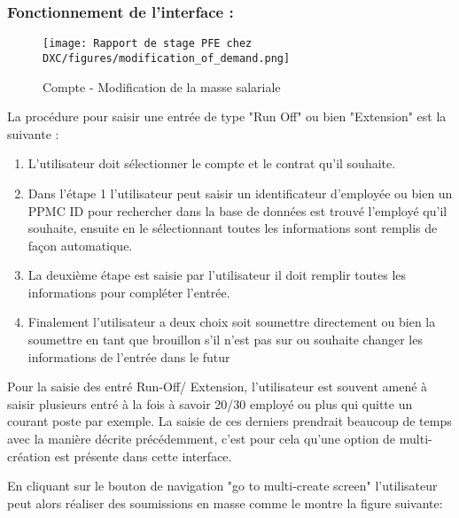 \subsubsection{Fonctionnement de l'interface :}

\begin{figure}[H]
    \centering
    \texttt{[image: Rapport de stage PFE chez DXC/figures/modification\_of\_demand.png]}
    \caption{Compte - Modification de la masse salariale}
\end{figure}

La procédure pour saisir une entrée de type "Run Off" ou bien "Extension" est la suivante :

\begin{enumerate}
    
    \item L'utilisateur doit sélectionner le compte et le contrat qu'il souhaite.
    \vspace{0.1cm}
    \item Dans l'étape 1 l'utilisateur peut saisir un identificateur d’employée ou bien un PPMC ID pour rechercher dans la base de données est trouvé l'employé qu'il souhaite, ensuite en le sélectionnant toutes les informations sont remplis de façon automatique.
    \vspace{0.1cm}
    \item La deuxième étape est saisie par l'utilisateur il doit remplir toutes les informations pour compléter l'entrée.
    \vspace{0.1cm}
    \item Finalement l'utilisateur a deux choix soit soumettre directement ou bien la soumettre en tant que brouillon s'il n'est pas sur ou souhaite changer les informations de l'entrée dans le futur

\end{enumerate}

\newpage
Pour la saisie des entré Run-Off/ Extension, l'utilisateur est souvent amené à saisir plusieurs entré à la fois à savoir 20/30 employé ou plus qui quitte un courant poste par exemple. La saisie de ces derniers prendrait beaucoup de temps avec la manière décrite précédemment, c'est pour cela qu'une option de multi-création est présente dans cette interface. 

\vspace{0.3cm}

En cliquant sur le bouton de navigation "go to multi-create screen" l'utilisateur peut alors réaliser des soumissions en masse comme le montre la figure suivante:


